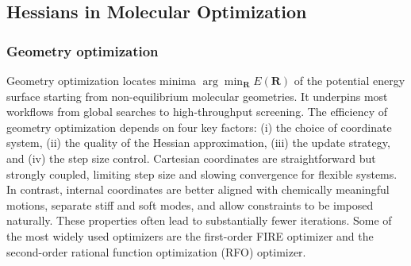 \documentclass[pdflatex,sn-mathphys-num]{sn-jnl}%
\theoremstyle{thmstyleone}%
\theoremstyle{thmstyletwo}%
\theoremstyle{thmstylethree}%
\begin{document}
\begin{appendices}
\subsection{Hessians in Molecular Optimization}

\subsubsection{Geometry optimization \label{sec:optimizerliterature}}
Geometry optimization locates minima $\arg\!\min_\mathbf{R} E(\mathbf{R})$ of the potential energy surface starting from non-equilibrium molecular geometries. It underpins most workflows from global searches\cite{christiansen2022,ronne2022} to high-throughput screening\cite{westermayr2023,ronne2024}. 
The efficiency of geometry optimization depends on four key factors: (i) the choice of coordinate system, (ii) the quality of the Hessian approximation, (iii) the update strategy, and (iv) the step size control. 
Cartesian coordinates are straightforward but strongly coupled, limiting step size and slowing convergence for flexible systems. In contrast, internal coordinates are better aligned with chemically meaningful motions, separate stiff and soft modes, and allow constraints to be imposed naturally. These properties often lead to substantially fewer iterations. 
Some of the most widely used optimizers are the first-order FIRE \citep{bitzek2006} optimizer and the second-order rational function optimization (RFO) optimizer.


\end{appendices}
\end{document}
